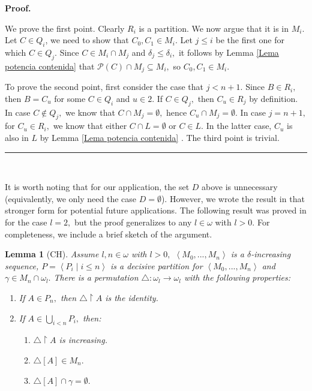 \documentclass{article}%
\newtheorem{lemma}[theorem]{Lemma}
\newenvironment{proof}[1][Proof]{\noindent\textbf{#1.} }{\ \rule{0.5em}{0.5em}}
\begin{document}
\begin{proof}
\qquad\ \ \qquad\ \ 

We prove the first point. Clearly $R_{i}$ is a partition. We now argue that it
is in $M_{i}.$ Let $C\in Q_{i}$, we need to show that $C_{0},C_{1}\in M_{i}.$
Let $j\leq i$ be the first one for which $C\in Q_{j}.$ Since $C\in M_{i}\cap
M_{j}$ and $\delta_{j}\leq\delta_{i},$ it follows by Lemma
\ref{Lema potencia contenida} that $\mathcal{P}\left(  C\right)  \cap
M_{j}\subseteq M_{i},$ so $C_{0},C_{1}\in M_{i}.$

\qquad\qquad\qquad

To prove the second point, first consider the case that $j<n+1.$ Since $B\in
R_{i},$ then $B=C_{u}$ for some $C\in Q_{i}$ and $u\in2.$ If $C\in Q_{j},$
then $C_{u}\in R_{j}$ by definition. In case $C\notin Q_{j},$ we know that
$C\cap M_{j}=\emptyset,$ hence $C_{u}\cap M_{j}=\emptyset.$ In case $j=n+1,$
for $C_{u}\in R_{i},$ we know that either $C\cap L=\emptyset$ or $C\in L.$ In
the latter case, $C_{u}$ is also in $L$ by Lemma \ref{Lema potencia contenida}%
. The third point is trivial.
\end{proof}

\qquad\qquad\ \ \ \ \qquad\ \ 

It is worth noting that for our application, the set $D$ above is unnecessary
(equivalently, we only need the case $D=\emptyset$). However, we wrote the
result in that stronger form for potential future applications. The following
result was proved in \cite{PFiltersCohenRandomLaver} for the case $l=2,$ but
the proof generalizes to any $l\in\omega$ with $l>0$. For completeness, we
include a brief sketch of the argument.

\begin{lemma}
[\textsf{CH}]Assume $l,n\in\omega$ with $l>0,$ $\left\langle M_{0}%
,...,M_{n}\right\rangle $ is a $\delta$-increasing sequence, $P=\left\langle
P_{i}\mid i\leq n\right\rangle $ is a decisive partition for $\left\langle
M_{0},...,M_{n}\right\rangle $ and $\gamma\in M_{n}\cap\omega_{l}.$ There is a
permutation $\triangle:\omega_{l}\longrightarrow\omega_{l}$ with the following
properties: \label{Permutacion}

\begin{enumerate}
\item If $A\in P_{n},$ then $\triangle\upharpoonright A$ is the identity.

\item If $A\in\bigcup\limits_{i<n}P_{i},$ then:

\begin{enumerate}
\item $\triangle\upharpoonright A$ is increasing.

\item $\triangle\left[  A\right]  \in M_{n}.$

\item $\triangle\left[  A\right]  \cap\gamma=\emptyset.$
\end{enumerate}
\end{enumerate}
\end{lemma}
\end{document}
